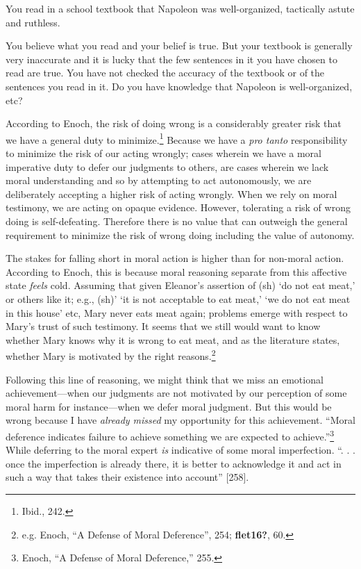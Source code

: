 \documentclass[
  12pt,
]{book}
\newenvironment{Shaded}{\begin{snugshade}}{\end{snugshade}}
\newcommand{\NormalTok}[1]{#1}
\theoremstyle{definition}
\theoremstyle{definition}
\theoremstyle{definition}
\theoremstyle{definition}
\theoremstyle{remark}
\begin{document}
\begin{Shaded}
\begin{Highlighting}[]

\NormalTok{You read in a school textbook that Napoleon was well{-}organized, tactically astute and ruthless.}
\end{Highlighting}
\end{Shaded}

You believe what you read and your belief is true. But your textbook is generally very inaccurate and it is lucky that the few sentences in it you have chosen to read are true. You have not checked the accuracy of the textbook or of the sentences you read in it. Do you have knowledge that Napoleon is well-organized, etc?

According to Enoch, the risk of doing wrong is a considerably greater risk that we have a general duty to minimize.\footnote{Ibid., 242.} Because we have a \emph{pro tanto} responsibility to minimize the risk of our acting wrongly; cases wherein we have a moral imperative duty to defer our judgments to others, are cases wherein we lack moral understanding and so by attempting to act autonomously, we are deliberately accepting a higher risk of acting wrongly. When we rely on moral testimony, we are acting on opaque evidence. However, tolerating a risk of wrong doing is self-defeating. Therefore there is no value that can outweigh the general requirement to minimize the risk of wrong doing including the value of autonomy.

The stakes for falling short in moral action is higher than for non-moral action. According to Enoch, this is because moral reasoning separate from this affective state \emph{feels} cold. Assuming that given Eleanor's assertion of (sh) `do not eat meat,' or others like it; e.g., (sh)' `it is not acceptable to eat meat,' `we do not eat meat in this house' etc, Mary never eats meat again; problems emerge with respect to Mary's trust of such testimony. It seems that we still would want to know whether Mary knows why it is wrong to eat meat, and as the literature states, whether Mary is motivated by the right reasons.\footnote{e.g. Enoch, {``A {Defense} of {Moral Deference}''}, 254; \textbf{flet16?}, 60.}

Following this line of reasoning, we might think that we miss an emotional achievement---when our judgments are not motivated by our perception of some moral harm for instance---when we defer moral judgment. But this would be wrong because I have \emph{already missed} my opportunity for this achievement. ``Moral deference indicates failure to achieve something we are expected to achieve.''\footnote{Enoch, {``A {Defense} of {Moral Deference},''} 255.} While deferring to the moral expert \emph{is} indicative of some moral imperfection. ``. . . once the imperfection is already there, it is better to acknowledge it and act in such a way that takes their existence into account'' {[}258{]}.
\end{document}
